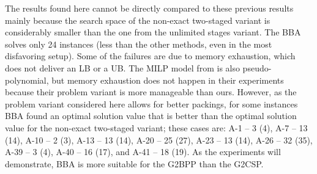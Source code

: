 The results found here cannot be directly compared to these previous results mainly because the search space of the non-exact two-staged variant is considerably smaller than the one from the unlimited stages variant.
The BBA solves only 24 instances (less than the other methods, even in the most disfavoring setup).
Some of the failures are due to memory exhaustion, which does not deliver an LB or a UB.
The MILP model from \citet{macedo:2010} is also pseudo-polynomial, but memory exhaustion does not happen in their experiments because their problem variant is more manageable than ours.
However, as the problem variant considered here allows for better packings, for some instances BBA found an optimal solution value that is better than the optimal solution value for the non-exact two-staged variant; these cases are: A-1 -- 3 (4), A-7 -- 13 (14), A-10 -- 2 (3), A-13 -- 13 (14), A-20 -- 25 (27), A-23 -- 13 (14), A-26 -- 32 (35), A-39 -- 3 (4), A-40 -- 16 (17), and A-41 -- 18 (19).
As the experiments will demonstrate, BBA is more suitable for the G2BPP than the G2CSP.


